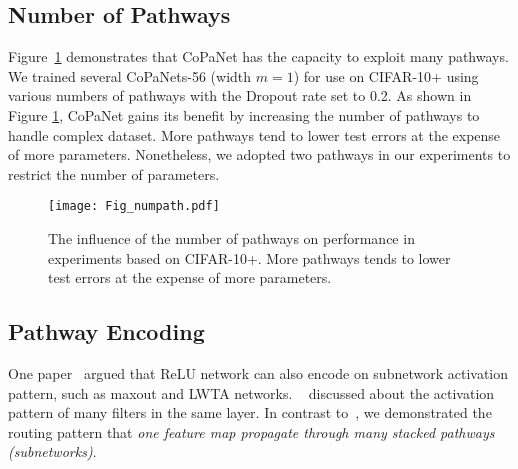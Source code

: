 \documentclass[wcp]{jmlr}
\begin{document}
\subsection{Number of Pathways}
Figure~\ref{pathway} demonstrates that CoPaNet has the capacity to exploit many pathways. 
We trained several CoPaNets-56 (width $m=1$) for use on CIFAR-10+ using various numbers of pathways with the Dropout rate set to 0.2. 
As shown in Figure \ref{pathway}, CoPaNet gains its benefit by increasing the number of pathways to handle complex dataset.
More pathways tend to lower test errors at the expense of more parameters.
Nonetheless, we adopted two pathways in our experiments to restrict the number of parameters.

\begin{figure}
\centering
\texttt{[image: Fig\_numpath.pdf]}
\caption{The influence of the number of pathways on performance in experiments based on CIFAR-10+. More pathways tends to lower test errors at the expense of more parameters.}
\label{pathway}
\end{figure}

\subsection{Pathway Encoding}
One paper~\citep{srivastava2014understanding} argued that ReLU network can also encode on subnetwork activation pattern, such as maxout and LWTA networks.
~\cite{srivastava2014understanding} discussed about the activation pattern of many filters in the same layer.
In contrast to~\cite{srivastava2014understanding}, we demonstrated the routing pattern that \textit{one feature map propagate through many stacked pathways (subnetworks)}.
\end{document}
